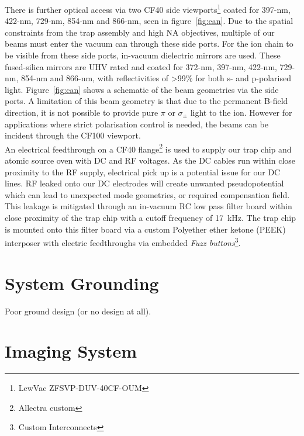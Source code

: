     There is further optical access via
    two CF40 side viewports\footnote{LewVac ZFSVP-DUV-40CF-OUM} coated
    for 397-nm, 422-nm, 729-nm, 854-nm and 866-nm, seen in figure~\ref{fig:can}.  Due to the spatial
    constraints from the trap assembly and high NA objectives, 
    multiple of our beams must enter the vacuum can through these side ports. For the ion chain to be visible from these side ports, in-vacuum dielectric
    mirrors are used. These fused-silica mirrors are UHV rated and coated for 372-nm, 397-nm,
    422-nm, 729-nm, 854-nm and 866-nm, with reflectivities of >99\% for both s-
    and p-polarised light. Figure~\ref{fig:can} shows a schematic of the beam
    geometries via the side ports. A limitation of this beam geometry is that due to the permanent B-field direction, it is not possible to provide pure $\pi$ or $\sigma_{\pm}$ light to the ion. However for applications where strict polarisation control is needed, the beams can be incident through the CF100 viewport.\\
    An electrical feedthrough on a CF40 flange\footnote{Allectra custom} is used to supply our trap chip and atomic source oven with DC and RF voltages. As
    the DC cables run within close proximity to the RF supply, electrical pick
    up is a potential issue for our DC lines. RF leaked onto our DC electrodes
    will create unwanted pseudopotential which can lead to unexpected mode
    geometries, or required compensation field. This leakage is mitigated through
    an in-vacuum RC low pass filter board within close proximity of the trap
    chip with a cutoff frequency of 17~kHz. The trap chip is mounted onto this
    filter board via a custom Polyether ether ketone (PEEK) interposer with
    electric feedthroughs via embedded \emph{Fuzz buttons}\footnote{Custom
    Interconnects}. \\

\section{System Grounding}
    Poor ground design (or no design at all).

\section{Imaging System}
\label{sec:Imaging System}

